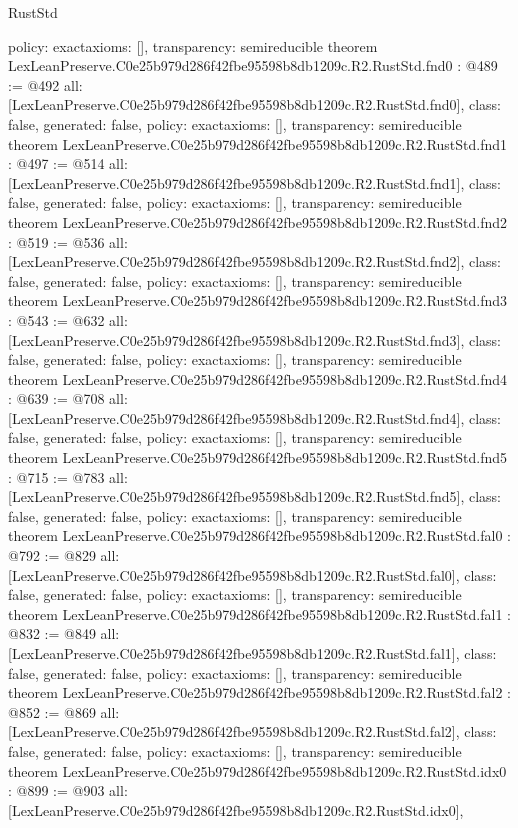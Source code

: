 \begin{lexlean}{RustStd}
\begin{coremodule}
{  policy: exact{axioms: []},
  transparency: semireducible
}
theorem LexLeanPreserve.C0e25b979d286f42fbe95598b8db1209c.R2.RustStd.fnd0 : @489 := @492 {
  all: [LexLeanPreserve.C0e25b979d286f42fbe95598b8db1209c.R2.RustStd.fnd0],
  class: false,
  generated: false,
  policy: exact{axioms: []},
  transparency: semireducible
}
theorem LexLeanPreserve.C0e25b979d286f42fbe95598b8db1209c.R2.RustStd.fnd1 : @497 := @514 {
  all: [LexLeanPreserve.C0e25b979d286f42fbe95598b8db1209c.R2.RustStd.fnd1],
  class: false,
  generated: false,
  policy: exact{axioms: []},
  transparency: semireducible
}
theorem LexLeanPreserve.C0e25b979d286f42fbe95598b8db1209c.R2.RustStd.fnd2 : @519 := @536 {
  all: [LexLeanPreserve.C0e25b979d286f42fbe95598b8db1209c.R2.RustStd.fnd2],
  class: false,
  generated: false,
  policy: exact{axioms: []},
  transparency: semireducible
}
theorem LexLeanPreserve.C0e25b979d286f42fbe95598b8db1209c.R2.RustStd.fnd3 : @543 := @632 {
  all: [LexLeanPreserve.C0e25b979d286f42fbe95598b8db1209c.R2.RustStd.fnd3],
  class: false,
  generated: false,
  policy: exact{axioms: []},
  transparency: semireducible
}
theorem LexLeanPreserve.C0e25b979d286f42fbe95598b8db1209c.R2.RustStd.fnd4 : @639 := @708 {
  all: [LexLeanPreserve.C0e25b979d286f42fbe95598b8db1209c.R2.RustStd.fnd4],
  class: false,
  generated: false,
  policy: exact{axioms: []},
  transparency: semireducible
}
theorem LexLeanPreserve.C0e25b979d286f42fbe95598b8db1209c.R2.RustStd.fnd5 : @715 := @783 {
  all: [LexLeanPreserve.C0e25b979d286f42fbe95598b8db1209c.R2.RustStd.fnd5],
  class: false,
  generated: false,
  policy: exact{axioms: []},
  transparency: semireducible
}
theorem LexLeanPreserve.C0e25b979d286f42fbe95598b8db1209c.R2.RustStd.fal0 : @792 := @829 {
  all: [LexLeanPreserve.C0e25b979d286f42fbe95598b8db1209c.R2.RustStd.fal0],
  class: false,
  generated: false,
  policy: exact{axioms: []},
  transparency: semireducible
}
theorem LexLeanPreserve.C0e25b979d286f42fbe95598b8db1209c.R2.RustStd.fal1 : @832 := @849 {
  all: [LexLeanPreserve.C0e25b979d286f42fbe95598b8db1209c.R2.RustStd.fal1],
  class: false,
  generated: false,
  policy: exact{axioms: []},
  transparency: semireducible
}
theorem LexLeanPreserve.C0e25b979d286f42fbe95598b8db1209c.R2.RustStd.fal2 : @852 := @869 {
  all: [LexLeanPreserve.C0e25b979d286f42fbe95598b8db1209c.R2.RustStd.fal2],
  class: false,
  generated: false,
  policy: exact{axioms: []},
  transparency: semireducible
}
theorem LexLeanPreserve.C0e25b979d286f42fbe95598b8db1209c.R2.RustStd.idx0 : @899 := @903 {
  all: [LexLeanPreserve.C0e25b979d286f42fbe95598b8db1209c.R2.RustStd.idx0],
}
\end{coremodule}
\end{lexlean}
